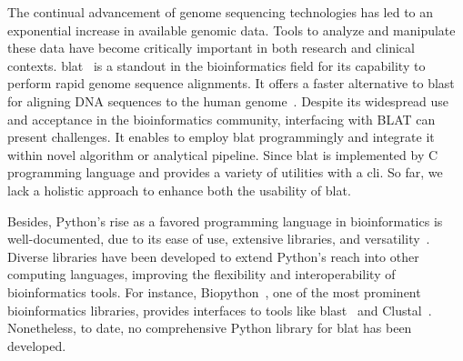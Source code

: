 


The continual advancement of genome sequencing technologies has led to an exponential increase in available genomic data.
Tools to analyze and manipulate these data have become critically important in both research and clinical contexts.
\gls{blat}~\citep{kent2002blat} is a standout in the bioinformatics field for its capability to perform rapid genome sequence alignments.
It offers a faster alternative to \gls{blast}~\citep{altschul1990basic}  for aligning DNA sequences to the human genome~\citep{kent2002blat}.
Despite its widespread use and acceptance in the bioinformatics community, interfacing with BLAT can present challenges.
It enables to employ \gls{blat} programmingly and integrate it within novel algorithm or analytical pipeline.
Since \gls{blat} is implemented by C programming language and provides a variety of utilities with a \gls{cli}.
So far, we lack a holistic approach to enhance both the usability of \gls{blat}.

Besides, Python's rise as a favored programming language in bioinformatics is well-documented, due to its ease of use, extensive libraries, and versatility~\citep{perkel2015programming}.
Diverse libraries have been developed to extend Python's reach into other computing languages, improving the flexibility and interoperability of bioinformatics tools.
For instance, Biopython~\citep{cock2009biopython}, one of the most prominent bioinformatics libraries, provides interfaces to tools like \gls{blast}~\citep{altschul1990basic} and Clustal~\citep{higgins1988clustal}.
Nonetheless, to date, no comprehensive Python library for \gls{blat} has been developed.

